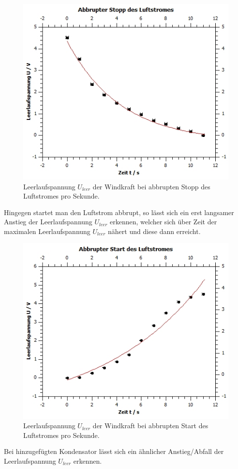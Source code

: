 \documentclass[12pt,a4paper,twoside]{article}
\begin{document}
\begin{figure}[H]
    \centering
    \includegraphics[width=0.6\linewidth]{nudes/wind stopp.jpg}
    \caption{Leerlaufspannung $U_{leer}$ der Windkraft bei abbrupten Stopp des Luftstromes pro Sekunde.}
    \label{fig:windkraft stopp diagramm}
\end{figure}

\noindent
Hingegen startet man den Luftstrom abbrupt, so lässt sich ein erst langsamer Anstieg der Leerlaufspannung $U_{leer}$ erkennen, welcher sich über Zeit der maximalen Leerlaufspannung $U_{leer}$ nähert und diese dann erreicht. 

\begin{figure}[H]
    \centering
    \includegraphics[width=0.6\linewidth]{nudes/wind start.jpg}
    \caption{Leerlaufspannung $U_{leer}$ der Windkraft bei abbrupten Start des Luftstromes pro Sekunde.}
    \label{fig:windkraft start diagramm}
\end{figure}

\noindent
Bei hinzugefügten Kondensator lässt sich ein ähnlicher Anstieg/Abfall der Leerlaufspannung $U_{leer}$ erkennen. 
\end{document}
